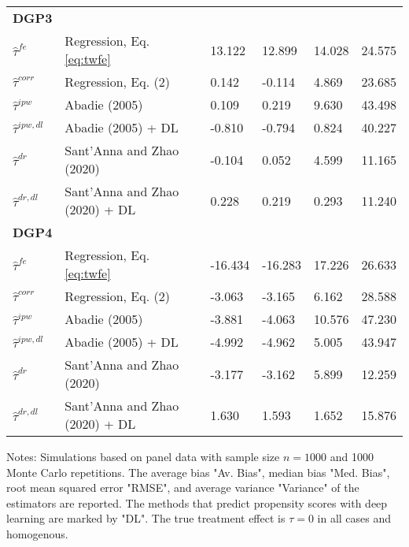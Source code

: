 \begin{table}[htbp]
{\begin{threeparttable}
\begin{tabular}{llllll}
\addlinespace
\large \textbf{DGP3}            &                                   &            &             &      &           \\
\addlinespace
$\hat{\tau}^{fe}$ & Regression, Eq. \eqref{eq:twfe}               & 13.122       & 12.899       & 14.028 & 24.575     \\
$\hat{\tau}^{corr}$ & Regression, Eq. (2)             & 0.142       & -0.114       & 4.869 & 23.685    \\
$\hat{\tau}^{ipw}$ & Abadie (2005)                    & 0.109     & 0.219      & 9.630 & 43.498     \\
$\hat{\tau}^{ipw,dl}$ & Abadie (2005) + DL            & -0.810       & -0.794        & 0.824 & 40.227       \\
$\hat{\tau}^{dr}$ & Sant'Anna and Zhao (2020)         & -0.104       & 0.052        & 4.599 & 11.165      \\
$\hat{\tau}^{dr,dl}$ & Sant'Anna and Zhao (2020) + DL & 0.228       & 0.219        & 0.293 & 11.240      \\  \midrule


\addlinespace
\large \textbf{DGP4}            &                                   &            &             &      &           \\
\addlinespace
$\hat{\tau}^{fe}$ & Regression, Eq. \eqref{eq:twfe}              & -16.434       & -16.283        & 17.226 & 26.633     \\
$\hat{\tau}^{corr}$ & Regression, Eq. (2)             & -3.063       & -3.165       & 6.162 & 28.588     \\
$\hat{\tau}^{ipw}$ & Abadie (2005)                    & -3.881       & -4.063        & 10.576 & 47.230      \\
$\hat{\tau}^{ipw,dl}$ & Abadie (2005) + DL            & -4.992       & -4.962        & 5.005 & 43.947      \\
$\hat{\tau}^{dr}$ & Sant'Anna and Zhao (2020)         &-3.177      &-3.162       & 5.899 & 12.259      \\
$\hat{\tau}^{dr,dl}$ & Sant'Anna and Zhao (2020) + DL & 1.630       & 1.593        & 1.652 & 15.876      \\


\bottomrule
\end{tabular}
\vspace{1em}
\begin{tablenotes}
\item Notes: Simulations based on panel data with sample size $n = 1000$ and 1000 Monte Carlo repetitions. The average bias "Av. Bias", median bias "Med. Bias", root mean squared error "RMSE", and average variance "Variance" of the estimators are reported. The methods that predict propensity scores with deep learning are marked by "DL". The true treatment effect is $\tau = 0$ in all cases and homogenous.
\end{tablenotes}
\end{threeparttable}}
\end{table}
